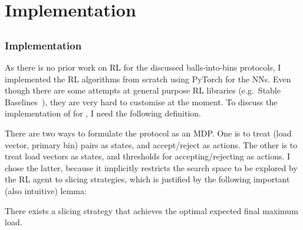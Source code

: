 \chapter{Implementation}\label{implementation}

\ifpdf
    \graphicspath{{Chapter3/Figs/Raster/}{Chapter3/Figs/PDF/}{Chapter3/Figs/}}
\else
    \graphicspath{{Chapter3/Figs/Vector/}{Chapter3/Figs/}}
\fi



\section{\TwoThinning}





\subsection{\DQL Implementation} \label{dqn-implmentation-two-thinning}


As there is no prior work on RL for the discussed balls-into-bins protocols, I implemented the RL algorithms from scratch using PyTorch for the NNs. Even though there are some attempts at general purpose RL libraries (e.g.\ Stable Baselines~\cite{hill2018stablebaselines}), they are very hard to customise at the moment. To discuss the implementation of \DQL for \TwoThinning, I need the following definition.


There are two ways to formulate the \TwoThinning protocol as an MDP. One is to treat (load vector, primary bin) pairs as states, and accept/reject as actions. The other is to treat load vectors as states, and thresholds for accepting/rejecting as actions. I chose the latter, because it implicitly restricts the search space to be explored by the RL agent to slicing strategies, which is justified by the following important (also intuitive) lemma:


\begin{lemma}  \label{lemma: thresholdproperty}
There exists a slicing strategy that achieves the optimal expected final maximum load.
\end{lemma}


